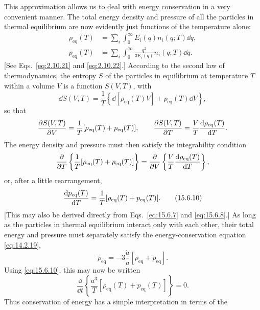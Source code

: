 This approximation allows us to deal with energy conservation in a very
convenient manner. The total energy density and pressure of all the particles
in thermal equilibrium are now evidently just functions of the temperature
alone:
\begin{align}
  \rho_{\mathrm{eq}}(T)
  &=
  \sum_i\int_0^\infty E_i(q)n_i(q;T)\dd q,
  \tag{15.6.7}\label{eq:15.6.7}\\
  p_{\mathrm{eq}}(T)
  &=
  \sum_i\int_0^\infty
  \frac{q^2}{3E_i(q)}n_i(q;T)\dd q.
  \tag{15.6.8}\label{eq:15.6.8}
\end{align}
[See Eqs.~\eqref{eq:2.10.21} and \eqref{eq:2.10.22}.] According to the second
law of thermodynamics, the entropy \(S\) of the particles in equilibrium at
temperature \(T\) within a volume \(V\) is a function \(S(V,T)\), with
\begin{equation}
  \dd S(V,T)
  =
  \frac1T\left\{
    \dd[\rho_{\mathrm{eq}}(T)V]+p_{\mathrm{eq}}(T)\dd V
  \right\},
  \tag{15.6.9}\label{eq:15.6.9}
\end{equation}
so that
\[
  \frac{\partial S(V,T)}{\partial V}
  =
  \frac1T[\rho_{\mathrm{eq}}(T)+p_{\mathrm{eq}}(T)],
  \qquad
  \frac{\partial S(V,T)}{\partial T}
  =
  \frac VT\frac{\mathop{}\!\mathrm{d} \rho_{\mathrm{eq}}(T)}{\mathop{}\!\mathrm{d} T}.
\]
The energy density and pressure must then satisfy the integrability condition
\[
  \frac{\partial }{\partial T}\left\{
    \frac1T[\rho_{\mathrm{eq}}(T)+p_{\mathrm{eq}}(T)]
  \right\}
  =
  \frac{\partial }{\partial V}\left\{
    \frac VT\frac{\mathop{}\!\mathrm{d} \rho_{\mathrm{eq}}(T)}{\mathop{}\!\mathrm{d} T}
  \right\},
\]
or, after a little rearrangement,
\begin{equation}
  \frac{\mathop{}\!\mathrm{d} p_{\mathrm{eq}}(T)}{\mathop{}\!\mathrm{d} T}
  =
  \frac1T[\rho_{\mathrm{eq}}(T)+p_{\mathrm{eq}}(T)].
  \tag{15.6.10}\label{eq:15.6.10}
\end{equation}
[This may also be derived directly from Eqs.~\eqref{eq:15.6.7} and
\eqref{eq:15.6.8}.] As long as the particles in thermal equilibrium interact
only with each other, their total energy and pressure must separately satisfy
the energy-conservation equation \eqref{eq:14.2.19},
\begin{equation}
  \dot\rho_{\mathrm{eq}}
  =
  -3\frac{\dot a}{a}
  [\rho_{\mathrm{eq}}+p_{\mathrm{eq}}].
  \tag{15.6.11}\label{eq:15.6.11}
\end{equation}
Using \eqref{eq:15.6.10}, this may now be written
\begin{equation}
  \frac{\dd}{\dd t}
  \left\{
    \frac{a^3}{T}[\rho_{\mathrm{eq}}(T)+p_{\mathrm{eq}}(T)]
  \right\}
  =
  0.
  \tag{15.6.12}\label{eq:15.6.12}
\end{equation}
Thus conservation of energy has a simple interpretation in terms of the
